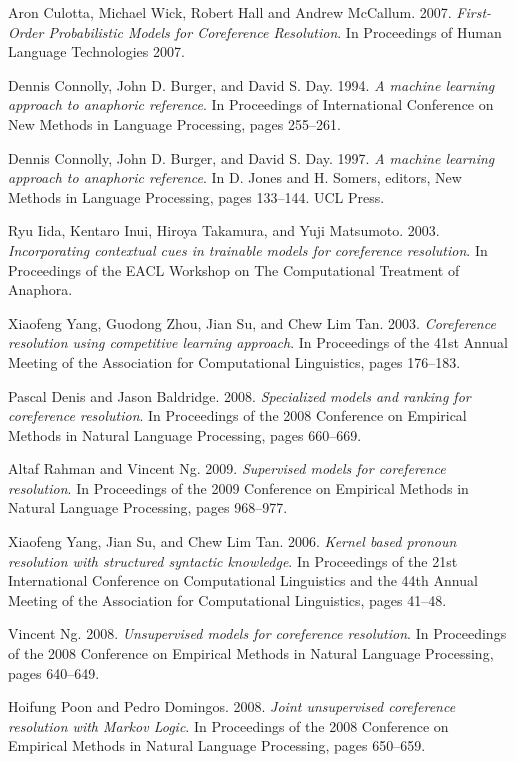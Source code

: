 \documentclass[12pt]{extarticle}
\begin{document}
\begin{thebibliography}{30}
	Aron Culotta, Michael Wick, Robert Hall and Andrew McCallum. 2007.
	\textit{First-Order Probabilistic Models for Coreference Resolution}.
	In Proceedings of Human Language Technologies 2007.

	Dennis Connolly, John D. Burger, and David S. Day. 1994.
	\textit{A machine learning approach to anaphoric reference}.
	In Proceedings of International Conference on New Methods in Language Processing, pages 255–261.

	Dennis Connolly, John D. Burger, and David S. Day. 1997.
	\textit{A machine learning approach to anaphoric reference}.
	In D. Jones and H. Somers, editors, New Methods in Language Processing, pages 133–144. UCL Press.

	Ryu Iida, Kentaro Inui, Hiroya Takamura, and Yuji Matsumoto. 2003.
	\textit{Incorporating contextual cues in trainable models for coreference resolution}.
	In Proceedings of the EACL Workshop on The Computational Treatment of Anaphora.

	Xiaofeng Yang, Guodong Zhou, Jian Su, and Chew Lim Tan. 2003.
	\textit{Coreference resolution using competitive learning approach}.
	In Proceedings of the 41st Annual Meeting of the Association for Computational Linguistics, pages 176–183.

	Pascal Denis and Jason Baldridge. 2008.
	\textit{Specialized models and ranking for coreference resolution}.
	In Proceedings of the 2008 Conference on Empirical Methods in Natural Language Processing, pages 660–669.

	Altaf Rahman and Vincent Ng. 2009.
	\textit{Supervised models for coreference resolution}.
	In Proceedings of the 2009 Conference on Empirical Methods in Natural Language Processing, pages 968–977.

	Xiaofeng Yang, Jian Su, and Chew Lim Tan. 2006.
	\textit{Kernel based pronoun resolution with structured syntactic knowledge}.
	In Proceedings of the 21st International Conference on Computational Linguistics and the 44th Annual Meeting of the Association
	for Computational Linguistics, pages 41–48.

	Vincent Ng. 2008.
	\textit{Unsupervised models for coreference resolution}.
	In Proceedings of the 2008 Conference on Empirical Methods in Natural Language Processing, pages 640–649.

	Hoifung Poon and Pedro Domingos. 2008.
	\textit{Joint unsupervised coreference resolution with Markov Logic}.
	In Proceedings of the 2008 Conference on Empirical Methods in Natural Language Processing, pages 650–659.


\end{thebibliography}
\end{document}
